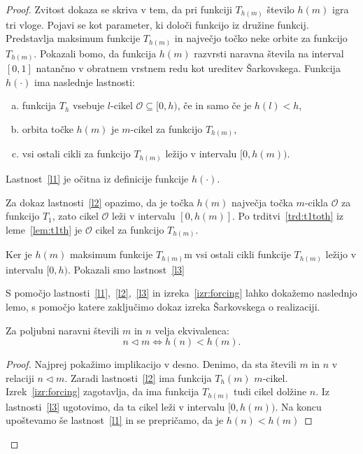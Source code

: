 \documentclass[../TG_magistrsko_delo_sections.tex]{subfiles}
\begin{document}
\begin{proof}
Zvitost dokaza se skriva v tem, da pri funkciji $T_{h(m)}$ število $h(m)$ igra tri vloge. Pojavi se kot parameter, ki določi funkcijo iz družine funkcij. Predstavlja maksimum funkcije $T_{h(m)}$ in največjo točko neke orbite za funkcijo $T_{h(m)}$. Pokazali bomo, da funkcija $h(m)$ razvrsti naravna števila na interval $[0, 1]$ natančno v obratnem vrstnem redu kot ureditev Šarkovskega.
Funkcija $h(\cdot)$ ima naslednje lastnosti:
\begin{enumerate}[(a)]
\item funkcija $T_h$  vsebuje $l$-cikel $\mathcal{O}\subseteq [0, h)$, če in samo če je $h(l)<h$,\label{l1}
\item orbita točke $h(m)$ je $m$-cikel za funkcijo $T_{h(m)}$,\label{l2}
\item vsi ostali cikli za funkcijo $T_{h(m)}$ ležijo v intervalu $[0, h(m)).$\label{l3}
\end{enumerate}

Lastnost~\ref{l1} je očitna iz definicije funkcije $h(\cdot)$.

Za dokaz lastnosti~\ref{l2} opazimo, da je točka $h(m)$ največja točka $m$-cikla $\mathcal{O}$ za funkcijo $T_1$, zato cikel $\mathcal{O}$ leži v intervalu $[0, h(m)]$. Po trditvi~\ref{trd:t1toth} iz leme~\ref{lem:t1th} je $\mathcal{O}$ cikel za funkcijo $T_{h(m)}$. 

Ker je $h(m)$ maksimum funkcije $T_{h(m)}$m vsi ostali cikli funkcije $T_{h(m)}$ ležijo v intervalu $[0, h)$. Pokazali smo lastnost~\ref{l3}

S pomočjo lastnosti~\ref{l1},~\ref{l2},~\ref{l3} in izreka~\ref{izr:forcing} lahko dokažemo naslednjo lemo, s pomočjo katere zaključimo dokaz izreka Šarkovskega o realizaciji.

\begin{lema}\label{lem:<rel}
Za poljubni naravni števili $m$ in $n$ velja ekvivalenca:
$$ n \triangleleft m \iff h(n) < h(m).$$
\end{lema}
\begin{proof}
Najprej pokažimo implikacijo v desno. Denimo, da sta števili $m$ in $n$ v relaciji $n \triangleleft m$. Zaradi lastnosti~\ref{l2} ima funkcija $T_h(m)$ $m$-cikel. Izrek~\ref{izr:forcing} zagotavlja, da ima funkcija $T_{h(m)}$ tudi cikel dolžine $n$. Iz lastnosti~\ref{l3} ugotovimo, da ta cikel leži v intervalu $[0, h(m))$. Na koncu upoštevamo še lastnost~\ref{l1} in se prepričamo, da je $h(n) < h(m)$


\end{proof}
\end{proof}
\end{document}

